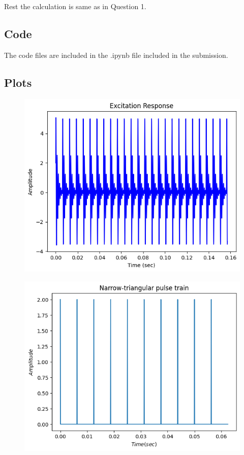 \documentclass{article}
\begin{document}
Rest the calculation is same as in Question 1.

\subsection{Code}
The code files are included in the .ipynb file included in the submission.

\subsection{Plots}


\begin{figure}[H]
\begin{center}
\includegraphics[scale = 0.5]{Q2_Response.png}
\end{center}
\end{figure}


\begin{figure}[H]
\begin{center}
\includegraphics[scale = 0.5]{Q2_Train.png}
\end{center}
\end{figure}
\end{document}
